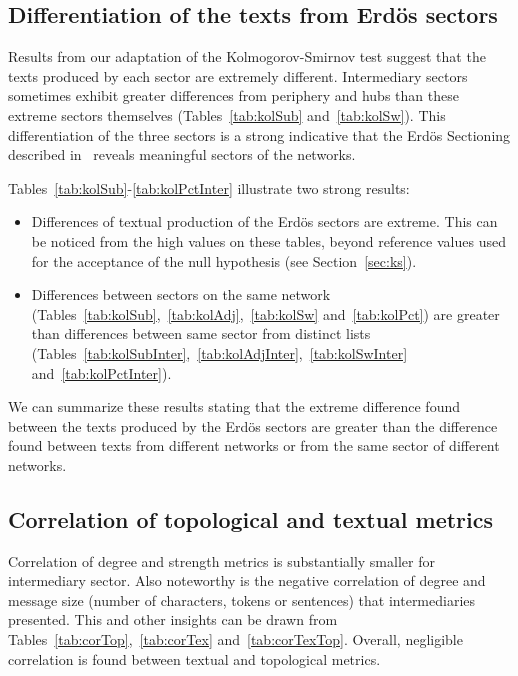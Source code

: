 \subsection{Differentiation of the texts from Erd\"os sectors}\label{subsec:di}








Results from our adaptation of the Kolmogorov-Smirnov test
suggest that the texts produced by each sector are extremely different.
Intermediary sectors sometimes exhibit greater differences 
from periphery and hubs than these extreme sectors themselves 
(Tables~\ref{tab:kolSub} and~\ref{tab:kolSw}).
This differentiation of the three sectors is a
strong indicative that the Erd\"os Sectioning
described in~\cite{evoSN} reveals meaningful
sectors of the networks.

Tables~\ref{tab:kolSub}-\ref{tab:kolPctInter}
illustrate two strong results:
\begin{itemize}
    \item Differences of textual production of the Erd\"os sectors are extreme.
	    This can be noticed from the high values on these tables,
	    beyond reference values used for the acceptance of the 
	    null hypothesis (see Section~\ref{sec:ks}).
    \item Differences between sectors on the same network 
	    (Tables~\ref{tab:kolSub},~\ref{tab:kolAdj},~\ref{tab:kolSw} and~\ref{tab:kolPct}) are greater than differences between same sector from distinct lists (Tables~\ref{tab:kolSubInter},~\ref{tab:kolAdjInter},~\ref{tab:kolSwInter} and~\ref{tab:kolPctInter}).
\end{itemize}

We can summarize these results stating that the extreme difference
found between the texts produced by the Erd\"os sectors
are greater than the difference found between texts from different
networks or from the same sector of different networks.

\subsection{Correlation of topological and textual metrics}\label{subsec:cor}


Correlation of degree 
and strength metrics is
substantially smaller for intermediary sector.
Also noteworthy is the negative correlation of degree and message size (number of characters, tokens or sentences) that intermediaries presented.
This and other insights can be drawn from Tables~\ref{tab:corTop},~\ref{tab:corTex} and~\ref{tab:corTexTop}.
Overall, negligible correlation is found between textual and topological metrics.

